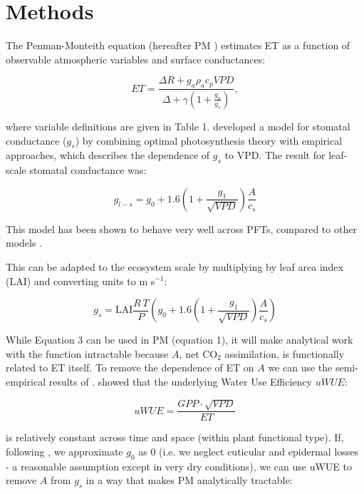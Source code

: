 \documentclass[draft,linenumbers]{agujournal}
\begin{document}
\section{Methods}
\label{methods}
The Penman-Monteith equation (hereafter PM ) estimates ET as a function of observable atmospheric variables and surface conductances:
\begin{linenomath*}
  \begin{equation}
      ET = \frac{\Delta R + g_a \rho_a c_p VPD}{\Delta + \gamma(1 + \frac{g_a}{g_s})},
  \end{equation}
\end{linenomath*}
where variable definitions are given in Table 1. \citet{MEDLYN_2011} developed a model for stomatal conductance ($g_s$) by combining optimal photosynthesis theory \citep{Farquhar_1980, Katul_2010} with empirical approaches, which describes the dependence of $g_s$ to VPD. The result for leaf-scale stomatal conductance was:

\begin{linenomath*}
  \begin{equation}
  g_{l-s} = g_0 + 1.6 \left(1 + \frac{g_1}{\sqrt{VPD}}\right) \frac{A}{c_s}
  \end{equation}
\end{linenomath*}
This model has been shown to behave very well across PFTs, compared to other models \citep{Lin_2015}.

This can be adapted to the ecosystem scale by multiplying by leaf area index (LAI) and converting units to m s$^{-1}$:

\begin{linenomath*}
  \label{medlyn}
  \begin{equation}
  g_s = \text{LAI} \frac{R \,T}{P} \left( g_0 + 1.6 \left(1 + \frac{g_1}{\sqrt{VPD}}\right) \frac{A}{c_s}\right)
  \end{equation}
\end{linenomath*}

While Equation 3 can be used in PM (equation 1), it will make analytical work with the function intractable because $A$, net CO$_2$ assimilation, is functionally related to ET itself. To remove the dependence of ET on $A$ we can use the semi-empirical results of \citet{Zhou_2015}. \citet{Zhou_2015} showed that the underlying Water Use Efficiency $uWUE$:

\begin{linenomath*}
  \begin{equation}
    \label{uwue}
uWUE = \frac{GPP \cdot \sqrt{VPD}}{ET}
  \end{equation}
\end{linenomath*}
is relatively constant across time and space (within plant functional type). If, following \citet{Lin_2015}, we approximate $g_0$ as $0$ (i.e. we neglect cuticular and epidermal losses - a reasonable assumption except in very dry conditions), we can use uWUE to remove $A$ from $g_s$ in a way that makes PM analytically tractable:
\end{document}

